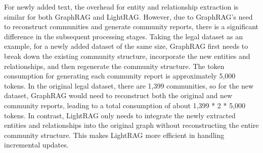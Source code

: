 For newly added text, the overhead for entity and relationship extraction is similar for both GraphRAG and LightRAG. However, due to GraphRAG's need to reconstruct communities and generate community reports, there is a significant difference in the subsequent processing stages. Taking the legal dataset as an example, for a newly added dataset of the same size, GraphRAG first needs to break down the existing community structure, incorporate the new entities and relationships, and then regenerate the community structure. The token consumption for generating each community report is approximately 5,000 tokens. In the original legal dataset, there are 1,399 communities, so for the new dataset, GraphRAG would need to reconstruct both the original and new community reports, leading to a total consumption of about 1,399 * 2 * 5,000 tokens. In contrast, LightRAG only needs to integrate the newly extracted entities and relationships into the original graph without reconstructing the entire community structure. This makes LightRAG more efficient in handling incremental updates.

